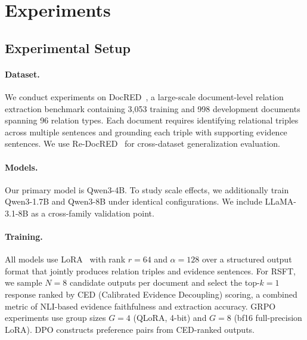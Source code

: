 \section{Experiments}
\label{sec:experiments}

\subsection{Experimental Setup}
\label{sec:setup}

\paragraph{Dataset.}
We conduct experiments on DocRED~\citep{yao2019docred}, a large-scale document-level relation extraction benchmark containing 3,053 training and 998 development documents spanning 96 relation types. Each document requires identifying relational triples across multiple sentences and grounding each triple with supporting evidence sentences. We use Re-DocRED~\citep{tan2022redocred} for cross-dataset generalization evaluation.

\paragraph{Models.}
Our primary model is Qwen3-4B. To study scale effects, we additionally train Qwen3-1.7B and Qwen3-8B under identical configurations. We include LLaMA-3.1-8B as a cross-family validation point.

\paragraph{Training.}
All models use LoRA~\citep{hu2022lora} with rank $r{=}64$ and $\alpha{=}128$ over a structured output format that jointly produces relation triples and evidence sentences. For RSFT, we sample $N{=}8$ candidate outputs per document and select the top-$k{=}1$ response ranked by CED (Calibrated Evidence Decoupling) scoring, a combined metric of NLI-based evidence faithfulness and extraction accuracy. GRPO experiments use group sizes $G{=}4$ (QLoRA, 4-bit) and $G{=}8$ (bf16 full-precision LoRA). DPO constructs preference pairs from CED-ranked outputs.


